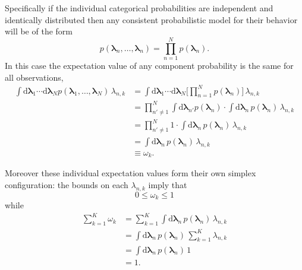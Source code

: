 \documentclass[
  letterpaper,
  DIV=11,
  numbers=noendperiod]{scrartcl}
\begin{document}
Specifically if the individual categorical probabilities are independent
and identically distributed then any consistent probabilistic model for
their behavior will be of the form \[
p(\boldsymbol{\lambda}_{n}, \ldots, \boldsymbol{\lambda}_{n})
=
\prod_{n = 1}^{N} p(\boldsymbol{\lambda}_{n}).
\] In this case the expectation value of any component probability is
the same for all observations, \begin{align*}
\int \mathrm{d} \boldsymbol{\lambda}_{1} \cdots
     \mathrm{d} \boldsymbol{\lambda}_{N}
p(\boldsymbol{\lambda}_{1}, \ldots, \boldsymbol{\lambda}_{N}) \,
\lambda_{n, k}
&=
\int \mathrm{d} \boldsymbol{\lambda}_{1} \cdots
     \mathrm{d} \boldsymbol{\lambda}_{N}
\bigg[ \prod_{n = 1}^{N} p(\boldsymbol{\lambda}_{n}) \bigg] \,
\lambda_{n, k}
\\
&=
\prod_{n' \ne 1}^{N}
\int \mathrm{d} \boldsymbol{\lambda}_{n'}
p(\boldsymbol{\lambda}_{n})
\cdot
\int \mathrm{d} \boldsymbol{\lambda}_{n} \,
p(\boldsymbol{\lambda}_{n}) \, \lambda_{n, k}
\\
&=
\prod_{n' \ne 1}^{N} 1 \cdot
\int \mathrm{d} \boldsymbol{\lambda}_{n} \,
p(\boldsymbol{\lambda}_{n}) \, \lambda_{n, k}
\\
&=
\int \mathrm{d} \boldsymbol{\lambda}_{n} \,
p(\boldsymbol{\lambda}_{n}) \, \lambda_{n, k}
\\
&\equiv
\omega_{k}.
\end{align*}

Moreover these individual expectation values form their own simplex
configuration: the bounds on each \(\lambda_{n, k}\) imply that \[
0 \le \omega_{k} \le 1
\] while \begin{align*}
\sum_{k = 1}^{K} \omega_{k}
&=
\sum_{k = 1}^{K}
\int \mathrm{d} \boldsymbol{\lambda}_{n} \,
p(\boldsymbol{\lambda}_{n}) \, \lambda_{n, k}
\\
&=
\int \mathrm{d} \boldsymbol{\lambda}_{n} \,
p(\boldsymbol{\lambda}_{n}) \, \sum_{k = 1}^{K} \lambda_{n, k}
\\
&=
\int \mathrm{d} \boldsymbol{\lambda}_{n} \,
p(\boldsymbol{\lambda}_{n}) \, 1
\\
&=
1.
\end{align*}
\end{document}
